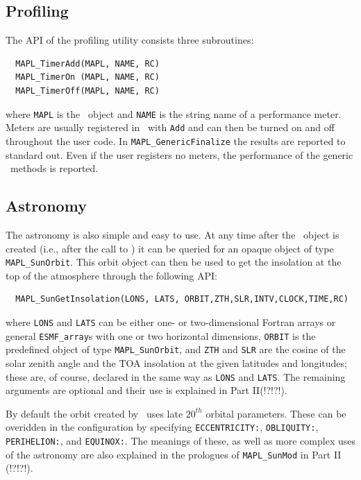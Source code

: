 \subsection{Profiling}
The API of the profiling utility consists three subroutines:
\begin{verbatim}
  MAPL_TimerAdd(MAPL, NAME, RC)
  MAPL_TimerOn (MAPL, NAME, RC)
  MAPL_TimerOff(MAPL, NAME, RC)
\end{verbatim}
where {\tt MAPL} is the \ggn\  object and {\tt NAME} is the string
name of a performance meter. Meters are usually registered in \ssv\
with {\tt Add} and can then be turned on and off throughout the user
code. In \texttt{MAPL\_GenericFinalize} the results are reported to standard
out. Even if the user registers no meters, the performance of the
generic \IRF\ methods is reported.

\subsection{Astronomy}

The astronomy is also simple and easy to use. At any time after the
\ggn\ object is created (i.e., after the call to \gssv) it can be
queried for an opaque object of type {\tt MAPL\_SunOrbit}.
This orbit object can
then be used to get the insolation at the top of the atmosphere
through the following API:

\begin{verbatim}
  MAPL_SunGetInsolation(LONS, LATS, ORBIT,ZTH,SLR,INTV,CLOCK,TIME,RC)
\end{verbatim}

where {\tt LONS} and {\tt LATS} can be either one- or two-dimensional
Fortran arrays or general \texttt{ESMF\_array}s with one or two horizontal
dimensions, {\tt ORBIT} is the predefined object of type
{\tt MAPL\_SunOrbit}, and {\tt ZTH} and {\tt SLR} are the cosine of the
solar zenith angle
and the TOA insolation at the given latitudes and longitudes; these are,
of course, declared in the same way as  {\tt LONS} and {\tt LATS}. The
remaining arguments are optional and their use is explained in Part II(!?!?!).

By default the orbit created by \ggn\  uses late $20^{th}$
orbital parameters. These can be
overidden in the configuration by specifying {\tt ECCENTRICITY:},
{\tt OBLIQUITY:}, {\tt PERIHELION:}, and {\tt EQUINOX:}. The meanings
of these, as well as more complex uses of the astronomy are also explained
in the prologues of {\tt MAPL\_SunMod} in Part II (!?!?!).

